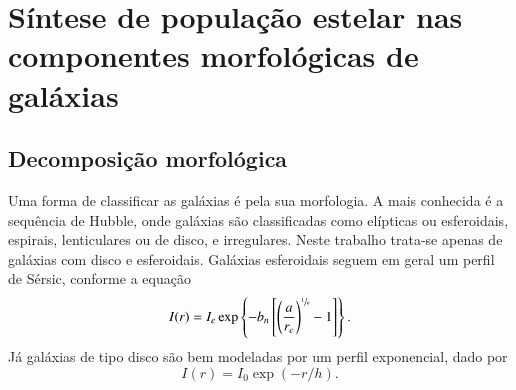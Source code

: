 


\chapter{Síntese de população estelar nas componentes morfológicas de galáxias}
\label{sec:Decomp}



\section{Decomposição morfológica}
\label{sec:Decomp:decomp}
 
Uma forma de classificar as galáxias é pela sua morfologia. A mais conhecida é a
sequência de Hubble, onde galáxias são classificadas como elípticas ou
esferoidais, espirais, lenticulares ou de disco, e irregulares.
Neste trabalho trata-se apenas de galáxias com disco e esferoidais. Galáxias
esferoidais seguem em geral um perfil de Sérsic, conforme a equação
\begin{equation*}
I(r) = I_e \exp \left\{- b_n \left[ \left( \frac{a}{r_e} \right)^{\sfrac{1}{n}}
- 1 \right] \right\}.
\end{equation*}
Já galáxias de tipo disco são bem modeladas por um perfil exponencial, dado por
\begin{equation*}
I(r) = I_0 \exp \left(- r / h \right).
\end{equation*}

